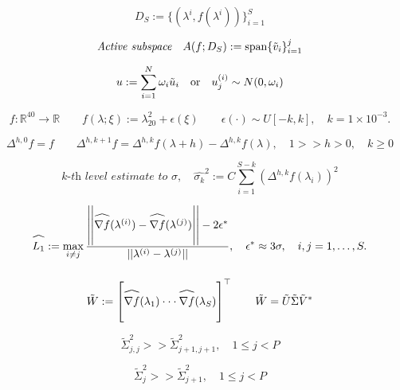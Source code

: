 \documentclass{amsart}
\newcommand\reallywidehat[1]{\arraycolsep=0pt\relax%
\begin{array}{c}
\stretchto{
  \scaleto{
    \scalerel*[\widthof{\ensuremath{#1}}]{\kern-.5pt\bigwedge\kern-.5pt}
    {\rule[-\textheight/2]{1ex}{\textheight}} %
  }{\textheight} %
}{0.5ex}\\           %
#1\\                 %
\rule{-1ex}{0ex}
\end{array}
}
\begin{document}
\newpage



$$D_S:=\{(\lambda^i,f(\lambda^i))\}_{i=1}^S$$

\vspace{2cm}

$$\textit{Active subspace} \quad A(f;D_S):=\text{span}\{\Tilde{v}_i\}_{i=1}^j$$

\vspace{2cm}

$$u:=\sum_{i=1}^N\omega_i \Tilde{u}_i \quad \text{or} \quad u_j^{(i)} \sim N(0,\omega_i)$$

\vspace{2cm}

$$f: \mathbb{R}^{40} \to \mathbb{R} \quad \quad  f(\lambda; \xi):=\lambda_{20}^2 + \epsilon(\xi) \quad \quad \epsilon(\cdot) \sim U[-k,k], \quad k=1 \times 10^{-3}.$$

\newpage

$$\Delta^{h,0} f =f \quad \quad \Delta^{h,k+1} f=\Delta^{h,k} f(\lambda+h)- \Delta^{h,k} f(\lambda), \quad 1>>h>0, \quad k \geq 0$$

\vspace{.95cm}

$$\textit{$k$-th level estimate to $\sigma,$}\quad \hat{\sigma_k}^2:=C\sum_{i=1}^{S-k}\left(\Delta^{h,k}f(\lambda_i)\right)^2$$


\vspace{3cm}


$$\reallywidehat{L_1}:= \max_{i \neq j} \frac{\left|\left|\reallywidehat{\nabla f}(\lambda^{(i)})-\reallywidehat{\nabla f}(\lambda^{(j)})\right|\right|-2\epsilon^*}{||\lambda^{(i)}-\lambda^{(j)}||}, \quad \epsilon^*\approx 3\sigma, \quad i,j=1,\ldots, S.$$

\vspace{1cm}

$$
\tilde{W}:=\begin{bmatrix}
\reallywidehat{\nabla f}(\lambda_1)
\cdot \cdot \cdot
\reallywidehat{\nabla f}(\lambda_S)\\
\end{bmatrix}^\top\quad \quad \tilde{W}=\tilde{U}\tilde{\Sigma}\tilde{V}^*$$

\vspace{.5cm}

$$\tilde{\Sigma}_{j,j}^2>>\tilde{\Sigma}_{j+1,j+1}^2, \quad 1\leq j <P$$

\vspace{2cm}

$$\tilde{\Sigma}_{j}^2>>\tilde{\Sigma}_{j+1}^2, \quad 1\leq j <P$$
\end{document}
